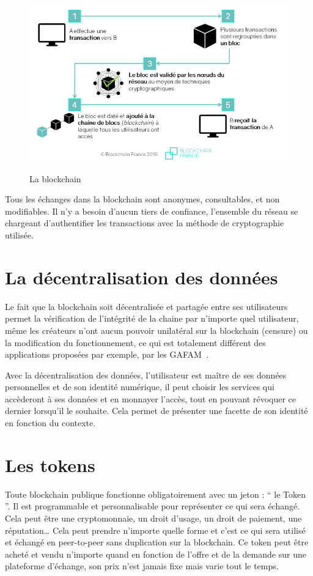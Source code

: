 \documentclass[12pt, a4paper, oneside]{book}
\begin{document}
\begin{figure}[H]
    \begin{center}
      \includegraphics[width=.55\textwidth]{images/blockchain.png}
      \label{fig:blockchain}
      \caption{La blockchain}
    \end{center}
\end{figure}

Tous les échanges dans la blockchain sont anonymes, consultables, et non modifiables. Il n'y a besoin d'aucun tiers de confiance, l’ensemble du réseau se chargeant d’authentifier les transactions avec la méthode de cryptographie utilisée.

\section{La décentralisation des données}
    Le fait que la blockchain soit décentralisée et partagée entre ses utilisateurs permet la vérification de l’intégrité de la chaine par n’importe quel utilisateur, même les créateurs n’ont aucun pouvoir unilatéral sur la blockchain (censure) ou la modification du fonctionnement, ce qui est totalement différent des applications proposées par exemple, par les GAFAM~\cite{GAFAM}.

Avec la décentralisation des données, l’utilisateur est maître de ses données personnelles et de son identité numérique, il peut choisir les services qui accèderont à ses données et en monnayer l’accès, tout en pouvant révoquer ce dernier lorsqu'il le souhaite. Cela permet de présenter une facette de son identité en fonction du contexte. 

\section{Les tokens}
Toute blockchain publique fonctionne obligatoirement avec un jeton : \hyphenquote{french}{ le Token }. Il est programmable et personnalisable pour représenter ce qui sera échangé. Cela peut être une cryptomonnaie, un droit d’usage, un droit de paiement, une réputation… Cela peut prendre n’importe quelle forme et c’est ce qui sera utilisé et échangé en peer-to-peer sans duplication sur la blockchain.
Ce token peut être acheté et vendu n’importe quand en fonction de l’offre et de la demande sur une plateforme d’échange, son prix n’est jamais fixe mais varie tout le temps. 
\end{document}
